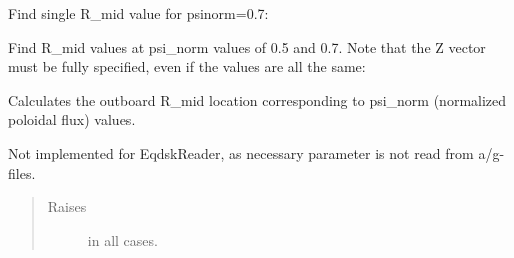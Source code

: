 \documentclass[letterpaper,10pt,english]{sphinxmanual}
\begin{document}
\begin{fulllineitems}
\begin{fulllineitems}
Find single R\_mid value for psinorm=0.7:

\begin{sphinxVerbatim}[commandchars=\\\{\}]
  
\end{sphinxVerbatim}

Find R\_mid values at psi\_norm values of 0.5 and 0.7.
Note that the Z vector must be fully specified, even if the
values are all the same:

\begin{sphinxVerbatim}[commandchars=\\\{\}]
  \PYG{p}{[} \PYG{p}{]}
\end{sphinxVerbatim}

\end{fulllineitems}


\begin{fulllineitems}
\label{\detokenize{eqtools:eqtools.eqdskreader.EqdskReader.psinorm2volnorm}}
Calculates the outboard R\_mid location corresponding to psi\_norm
(normalized poloidal flux) values.

Not implemented for EqdskReader, as necessary parameter is not read
from a/g-files.
\begin{quote}\begin{description}
\item[{Raises}] \leavevmode
{} \textendash{} in all cases.

\end{description}\end{quote}

\end{fulllineitems}



\end{fulllineitems}
\end{document}
